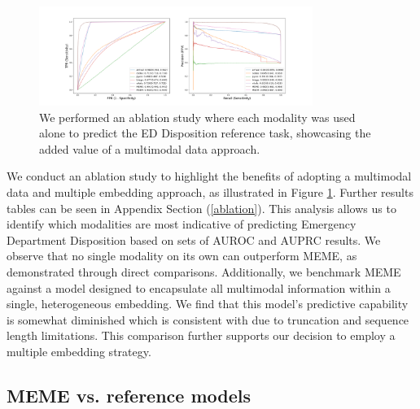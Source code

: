 \documentclass{article}
\theoremstyle{plain}
\theoremstyle{definition}
\theoremstyle{remark}
\begin{document}
\begin{figure}[h!]
   \centering 
   \includegraphics[width=3.5in]{plots/results.png} 
   \caption{We performed an ablation study where each modality was used alone to predict the ED Disposition reference task, showcasing the added value of a multimodal data approach.}
   \label{abs} 
 \end{figure} 
\vspace{-0.1cm}
We conduct an ablation study to highlight the benefits of adopting a multimodal data and multiple embedding approach, as illustrated in Figure \ref{abs}. Further results tables can be seen in Appendix Section (\ref{ablation}). This analysis allows us to identify which modalities are most indicative of predicting Emergency Department Disposition based on sets of AUROC and AUPRC results. We observe that no single modality on its own can outperform MEME, as demonstrated through direct comparisons. Additionally, we benchmark MEME against a model designed to encapsulate all multimodal information within a single, heterogeneous embedding. We find that this model's predictive capability is somewhat diminished which is consistent with \citep{rupp_exbehrt_2023} due to truncation and sequence length limitations. This comparison further supports our decision to employ a multiple embedding strategy.

\subsection{MEME vs. reference models}
\end{document}
